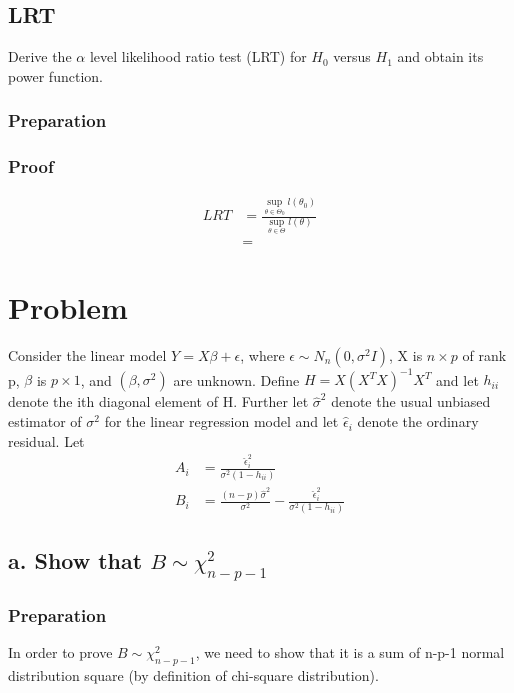 \subsection{LRT }

Derive the $\alpha$ level likelihood ratio test (LRT) for $H_0$ versus $H_1$ and obtain its power function.


\subsubsection{Preparation}


\subsubsection{Proof}

\begin{align*}
	LRT &= \frac{\underset{\theta \in \Theta_0}{\sup} l(\theta_0)}{\underset{\theta \in \Theta}{\sup} l(\theta)} \\
	&= 
\end{align*}




\section{Problem }
Consider the linear model $Y = X \beta + \epsilon$, where $\epsilon \sim N_n(0, \sigma^2 I)$, X is $n \times p$ of rank p, $\beta$ is $p \times 1$, and $(\beta, \sigma^2)$ are unknown. Define $H = X(X^TX)^{-1}X^T$ and let $h_{ii}$ denote the ith diagonal element of H. Further let $\hat{\sigma}^2$ denote the usual unbiased estimator of $\sigma^2$ for the linear regression model and let $\hat{\epsilon}_i$ denote the ordinary residual. Let 
\begin{align*}
	A_i & = \frac{\hat{\epsilon}_i^2}{\sigma^2(1-h_{ii})} \\
	B_i & = \frac{(n-p)\hat{\sigma}^2 }{\sigma^2} - \frac{\hat{\epsilon}_i^2}{\sigma^2(1-h_{ii})}
\end{align*}

\subsection{a. Show that $B \sim \chi^2_{n-p-1}$}

\subsubsection{Preparation}
In order to prove $B \sim \chi^2_{n-p-1}$, we need to show that it is a sum of n-p-1 normal distribution square (by definition of chi-square distribution). 

